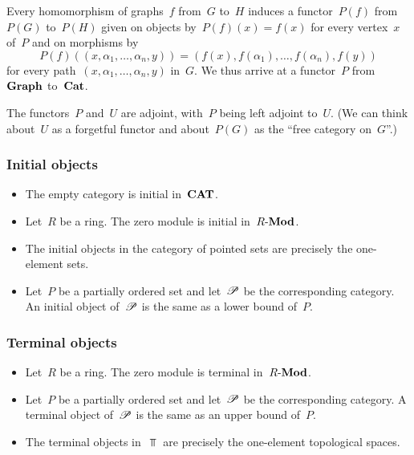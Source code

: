 \begin{itemize}
		Every homomorphism of graphs~$f$ from~$G$ to~$H$ induces a functor~$P(f)$ from~$P(G)$ to~$P(H)$ given on objects by~$P(f)(x) = f(x)$ for every vertex~$x$ of~$P$ and on morphisms by
		\[
			P(f)( (x, α_1, \dotsc, α_n, y) )
			=
			( f(x), f(α_1), \dotsc, f(α_n), f(y) )
		\]
		for every path~$(x, α_1, \dotsc, α_n, y)$ in~$G$.
		We thus arrive at a functor~$P$ from~$\mathbf{Graph}$ to~$\mathbf{Cat}$.

		The functors~$P$ and~$U$ are adjoint, with~$P$ being left adjoint to~$U$.
		(We can think about~$U$ as a forgetful functor and about~$P(G)$ as the \enquote{free category on~$G$}.)
\end{itemize}



\subsubsection*{Initial objects}

\begin{itemize}
	\item
		The empty category is initial in~$\mathbf{CAT}$.
	\item
		Let~$R$ be a ring.
		The zero module is initial in~$R\text{-}\mathbf{Mod}$.
	\item
		The initial objects in the category of pointed sets are precisely the one-element sets.
	\item
		Let~$P$ be a partially ordered set and let~$\mathscr{P}$ be the corresponding category.
		An initial object of~$\mathscr{P}$ is the same as a lower bound of~$P$.
\end{itemize}



\subsubsection*{Terminal objects}

\begin{itemize}
	\item
		Let~$R$ be a ring.
		The zero module is terminal in~$R\text{-}\mathbf{Mod}$.
	\item
		Let~$P$ be a partially ordered set and let~$\mathscr{P}$ be the corresponding category.
		A terminal object of~$\mathscr{P}$ is the same as an upper bound of~$P$.
	\item
		The terminal objects in~$\Top$ are precisely the one-element topological spaces.
\end{itemize}
